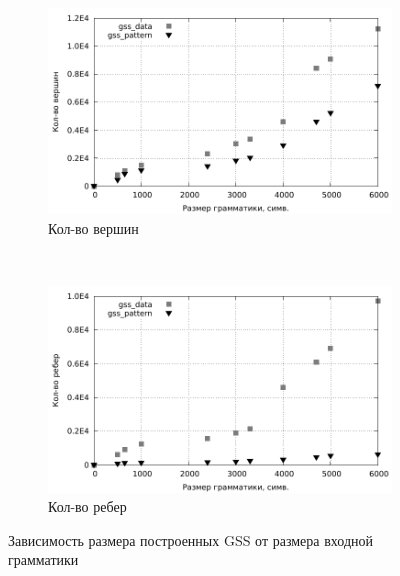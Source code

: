 \begin{figure}[h]
	\centering
	\begin{subfigure}[b]{0.45\textwidth}
		\centering
		\includegraphics[width=\textwidth]{pictures/gss.pdf}
		\caption{Кол-во вершин}
	\end{subfigure}
	~
	\begin{subfigure}[b]{0.45\textwidth}
		\centering
		\includegraphics[width=\textwidth]{pictures/gss_edge.pdf}
		\caption{Кол-во ребер}
	\end{subfigure}
	\caption{Зависимость размера построенных GSS от размера входной грамматики}
\end{figure}
